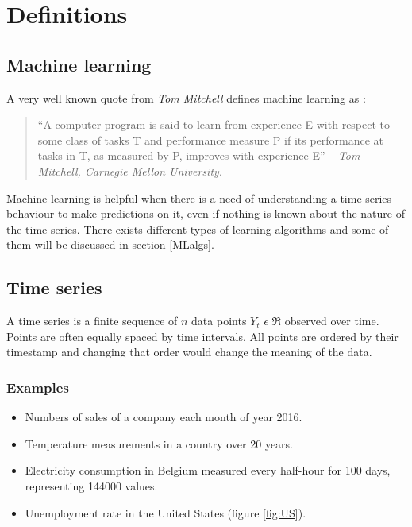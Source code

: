 \documentclass[11pt,a4paper,oneside]{book}
\newenvironment{myitemize}
{ \begin{itemize}
    \setlength\itemsep{0pt}}
{ \end{itemize}                  }
\begin{document}
\section{Definitions}


\subsection{Machine learning}

A very well known quote from \textit{Tom Mitchell} defines machine learning as : 

\vspace*{\fill} 
\begin{quote} 
\centering 
``A computer program is said to learn from experience E with respect to some class of tasks T and performance measure P if its performance at tasks in T, as measured by P, improves with experience E'' -- \textit{Tom Mitchell, Carnegie Mellon University}. 
\end{quote}
\vspace*{\fill}


Machine learning is helpful when there is a need of understanding a time series behaviour to make predictions on it, even if nothing is known about the nature of the time series. There exists different types of learning algorithms and some of them will be discussed in section \ref{MLalgs}.


\subsection{Time series}

A time series is a finite sequence of $n$ data points $Y_{t}$ $\epsilon$ $\Re$ observed over time. Points are often equally spaced by time intervals. All points are ordered by their timestamp and changing that order would change the meaning of the data. \cite{hyndman}

\subsubsection{Examples}

\begin{myitemize}
    \item Numbers of sales of a company each month of year 2016.
    \item Temperature measurements in a country over 20 years.
    \item Electricity consumption in Belgium measured every half-hour for 100 days, representing 144000 values.
    \item Unemployment rate in the United States (figure \ref{fig:US}).
\end{myitemize}
\end{document}
